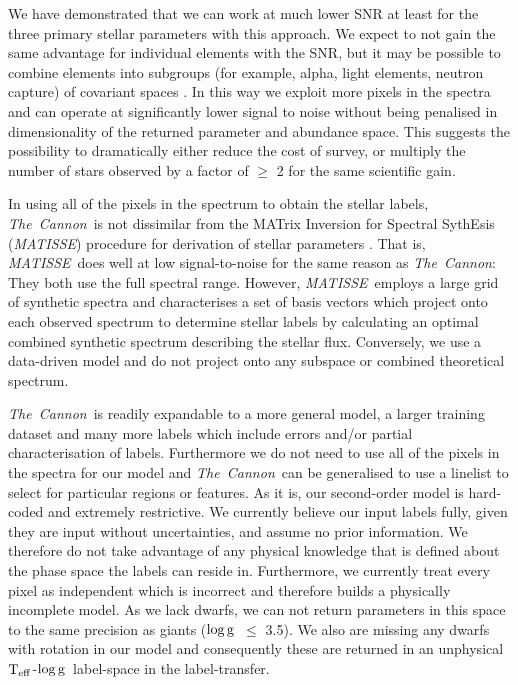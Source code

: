 \documentclass[12pt, preprint]{aastex}
\newcommand{\teff}{\mbox{$\rm T_{eff}$}}
\newcommand{\logg}{\mbox{$\rm \log g$}}
\newcommand{\tc}{\textsl{The~Cannon}}
\newcommand{\matisse}{\textsl{MATISSE}}
\begin{document}
We have demonstrated that we can work at much lower SNR at least for the three primary stellar parameters with this approach. 
We expect to not gain the same advantage for individual elements with the SNR, but it may be possible to combine elements into subgroups (for example, alpha, light elements, neutron capture) of covariant spaces \citep[e.g.,][]{Ting2012}. In this way we exploit more pixels in the spectra and can operate at significantly lower signal to noise without being penalised in dimensionality of the returned parameter and abundance space. 
This suggests the possibility to dramatically either reduce the cost of survey, or multiply the number of stars observed by a factor of $\ge$ 2 for the same scientific gain. 

In using all of the pixels in the spectrum to obtain the
stellar labels, \tc\ is not dissimilar from the MATrix Inversion for
Spectral SythEsis (\matisse) procedure for derivation of stellar
parameters \citep{RB2006}.
That is, \matisse\ does well at low signal-to-noise for the same
reason as \tc:  They both use the full spectral range.
However, \matisse\ employs a large grid of synthetic spectra and
characterises a set of basis vectors which project onto each observed
spectrum to determine stellar labels by calculating an optimal
combined synthetic spectrum describing the stellar flux.
Conversely, we use a data-driven model and do not project onto any
subspace or combined theoretical spectrum.

 \tc\ is readily expandable to a more general model, a larger training dataset and many more labels which include errors and/or partial characterisation of labels. Furthermore we do not need to use all of the pixels in the spectra for our model and \tc\ can be generalised to use a linelist to select for particular regions or features.
 As it is, our second-order model is hard-coded and extremely restrictive. 
 We currently believe our input labels fully, given they are input without uncertainties, and assume no prior information. 
 We therefore do not take advantage of any physical knowledge that is defined about the phase space the labels can reside in.  
 Furthermore, we currently treat every pixel as independent which is incorrect and therefore builds a physically incomplete model.  As we lack dwarfs, we can not return parameters in this space to the same precision as giants (\logg\ $\le$ 3.5).  
 We also are missing any dwarfs with rotation in our model and consequently these are returned in an unphysical \teff-\logg\ label-space in the label-transfer. 
\end{document}
